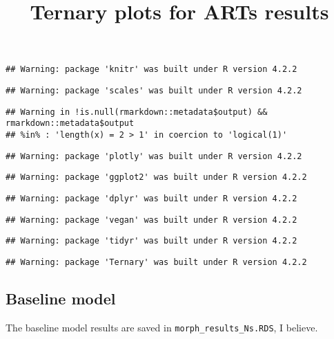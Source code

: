 \documentclass[
]{article}
\title{Ternary plots for ARTs results}
\author{}
\date{}
\begin{document}
\maketitle

\begin{verbatim}
## Warning: package 'knitr' was built under R version 4.2.2
\end{verbatim}

\begin{verbatim}
## Warning: package 'scales' was built under R version 4.2.2
\end{verbatim}

\begin{verbatim}
## Warning in !is.null(rmarkdown::metadata$output) && rmarkdown::metadata$output
## %in% : 'length(x) = 2 > 1' in coercion to 'logical(1)'
\end{verbatim}

\begin{verbatim}
## Warning: package 'plotly' was built under R version 4.2.2
\end{verbatim}

\begin{verbatim}
## Warning: package 'ggplot2' was built under R version 4.2.2
\end{verbatim}

\begin{verbatim}
## Warning: package 'dplyr' was built under R version 4.2.2
\end{verbatim}

\begin{verbatim}
## Warning: package 'vegan' was built under R version 4.2.2
\end{verbatim}

\begin{verbatim}
## Warning: package 'tidyr' was built under R version 4.2.2
\end{verbatim}

\begin{verbatim}
## Warning: package 'Ternary' was built under R version 4.2.2
\end{verbatim}

\hypertarget{baseline-model}{%
\subsection{Baseline model}\label{baseline-model}}

The baseline model results are saved in \texttt{morph\_results\_Ns.RDS},
I believe.
\end{document}
